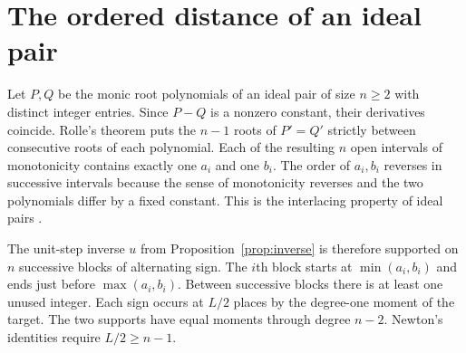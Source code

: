 \section{The ordered distance of an ideal pair}\label{sec:distance}
Let \(P,Q\) be the monic root polynomials of an ideal pair of size \(n\ge2\) with distinct integer entries. Since \(P-Q\) is a nonzero constant, their derivatives coincide. Rolle's theorem puts the \(n-1\) roots of \(P'=Q'\) strictly between consecutive roots of each polynomial. Each of the resulting \(n\) open intervals of monotonicity contains exactly one \(a_i\) and one \(b_i\). The order of \(a_i,b_i\) reverses in successive intervals because the sense of monotonicity reverses and the two polynomials differ by a fixed constant. This is the interlacing property of ideal pairs \cite[Theorem~2.1.3]{caley}.

The unit-step inverse \(u\) from Proposition~\ref{prop:inverse} is therefore supported on \(n\) successive blocks of alternating sign. The \(i\)th block starts at \(\min(a_i,b_i)\) and ends just before \(\max(a_i,b_i)\). Between successive blocks there is at least one unused integer. Each sign occurs at \(L/2\) places by the degree-one moment of the target. The two supports have equal moments through degree \(n-2\). Newton's identities require \(L/2\ge n-1\).

